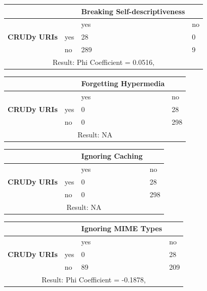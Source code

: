 \documentclass[a4paper,12pt]{article}
\begin{document}
\begin{center}
  \begin{tabular}{| p{60mm} | p{10mm} | p{35mm} | p{35mm} |}
  \hline
   & & \textbf{Breaking Self-descriptiveness} &
  \\
  \hline
  & & yes & no
  \\
  \hline
  \textbf{CRUDy URIs} & yes & 28 & 0
  \\
  \hline
   & no & 289 & 9
  \\
  \hline
  \multicolumn{4}{|c|}{Result: Phi Coefficient = 0.0516, }
  \\ \hline
  \end{tabular}
  \end{center}

\begin{center}
  \begin{tabular}{| p{60mm} | p{10mm} | p{35mm} | p{35mm} |}
  \hline
   & & \textbf{Forgetting Hypermedia} &
  \\
  \hline
  & & yes & no
  \\
  \hline
  \textbf{CRUDy URIs} & yes & 0 & 28
  \\
  \hline
   & no & 0 & 298
  \\
  \hline
  \multicolumn{4}{|c|}{Result: NA}
  \\ \hline
  \end{tabular}
  \end{center}

\begin{center}
  \begin{tabular}{| p{60mm} | p{10mm} | p{35mm} | p{35mm} |}
  \hline
   & & \textbf{Ignoring Caching} &
  \\
  \hline
  & & yes & no
  \\
  \hline
  \textbf{CRUDy URIs} & yes & 0 & 28
  \\
  \hline
   & no & 0 & 298
  \\
  \hline
  \multicolumn{4}{|c|}{Result: NA}
  \\ \hline
  \end{tabular}
  \end{center}

\begin{center}
  \begin{tabular}{| p{60mm} | p{10mm} | p{35mm} | p{35mm} |}
  \hline
   & & \textbf{Ignoring MIME Types} &
  \\
  \hline
  & & yes & no
  \\
  \hline
  \textbf{CRUDy URIs} & yes & 0 & 28
  \\
  \hline
   & no & 89 & 209
  \\
  \hline
  \multicolumn{4}{|c|}{Result: Phi Coefficient = -0.1878, }
  \\ \hline
  \end{tabular}
  \end{center}
\end{document}

